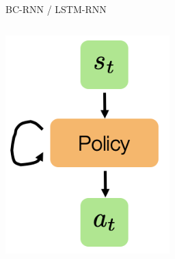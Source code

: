 \documentclass{beamer}
\begin{document}
\begin{frame}[t]{BC-RNN / LSTM-RNN}
\begin{columns}
\begin{column}{.2\textwidth}
\begin{center}
                \includegraphics[width=\textwidth]{./img/bc_rnn.png}
            \end{center}
		\end{column}
        \hspace{2em}
	\end{columns}


\end{frame}
\end{document}
